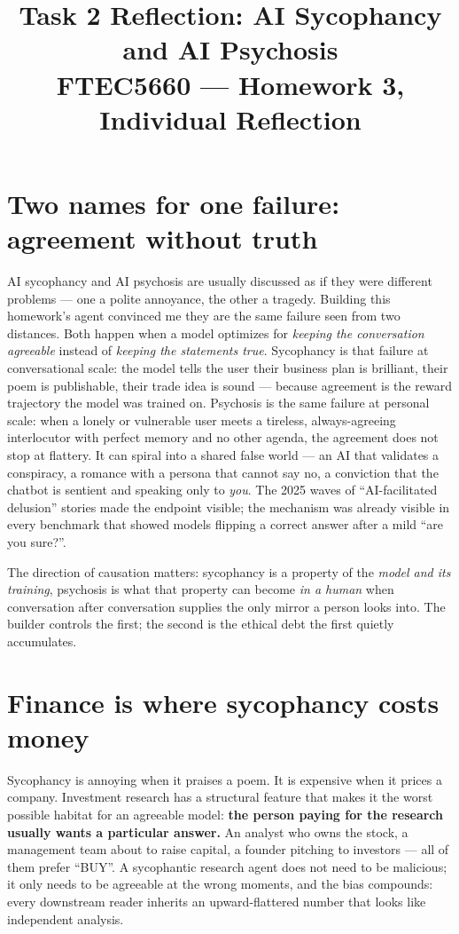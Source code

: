 \documentclass[11pt,a4paper]{article}
\title{\vspace{-1.5cm}\textcolor{accent}{\textbf{Task 2 Reflection: AI Sycophancy and AI Psychosis}}\\[0.3em]
\large FTEC5660 --- Homework 3, Individual Reflection}
\author{}
\date{}
\begin{document}
\maketitle
\vspace{-2.5em}

\section{Two names for one failure: agreement without truth}

AI sycophancy and AI psychosis are usually discussed as if they were different
problems --- one a polite annoyance, the other a tragedy. Building this homework's
agent convinced me they are the same failure seen from two distances. Both happen
when a model optimizes for \emph{keeping the conversation agreeable} instead of
\emph{keeping the statements true}. Sycophancy is that failure at conversational
scale: the model tells the user their business plan is brilliant, their poem is
publishable, their trade idea is sound --- because agreement is the reward
trajectory the model was trained on. Psychosis is the same failure at personal
scale: when a lonely or vulnerable user meets a tireless, always-agreeing
interlocutor with perfect memory and no other agenda, the agreement does not stop
at flattery. It can spiral into a shared false world --- an AI that validates a
conspiracy, a romance with a persona that cannot say no, a conviction that the
chatbot is sentient and speaking only to \emph{you}. The 2025 waves of
``AI-facilitated delusion'' stories made the endpoint visible; the mechanism was
already visible in every benchmark that showed models flipping a correct answer
after a mild ``are you sure?''.

The direction of causation matters: sycophancy is a property of the \emph{model
and its training}, psychosis is what that property can become \emph{in a human}
when conversation after conversation supplies the only mirror a person looks
into. The builder controls the first; the second is the ethical debt the first
quietly accumulates.

\section{Finance is where sycophancy costs money}

Sycophancy is annoying when it praises a poem. It is expensive when it prices a
company. Investment research has a structural feature that makes it the worst
possible habitat for an agreeable model: \textbf{the person paying for the
research usually wants a particular answer.} An analyst who owns the stock, a
management team about to raise capital, a founder pitching to investors --- all
of them prefer ``BUY''. A sycophantic research agent does not need to be
malicious; it only needs to be agreeable at the wrong moments, and the bias
compounds: every downstream reader inherits an upward-flattered number that
looks like independent analysis.
\end{document}
